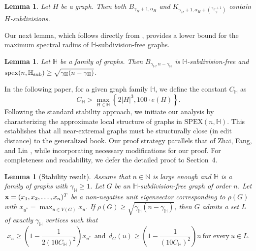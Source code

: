 \documentclass[11pt, a4paper]{article}
\newtheorem{lemma}[theorem]{Lemma}
\theoremstyle{definition}
\newcommand{\<}{\subseteq}
\newcommand{\red}[1]{\textcolor[rgb]{1.00,0.00,0.00}{#1}}
\begin{document}
\begin{lemma}\label{lem2.2}
    Let $H$ be a graph. Then both $B_{\gamma_H+1,\alpha_H}$ and $K_{\gamma_H+1,\alpha_H+\binom{\gamma_H+1}{2}}$ contain $H$-subdivisions.
\end{lemma}
Our next lemma, which follows directly from \cite[Lemma 2.6]{Zhai-minor}, provides a lower bound  for the maximum spectral radius of $\mathbb{H}$-subdivision-free graphs. 

\begin{lemma}\label{lem2.3}
Let $\mathbb{H}$ be a family of graphs. Then $B_{\gamma_\mathbb{H},n-\gamma_\mathbb{H}}$ is $\mathbb{H}$-subdivision-free and ${\rm spex}(n,\mathbb{H}_{\rm sub})\geq \sqrt{\gamma_\mathbb{H}(n-\gamma_\mathbb{H})}$.%
\end{lemma}

In the following paper, for a given graph family $\mathbb{H}$, we define the constant $C_\mathbb{H}$ as
$$
C_\mathbb{H}>\max_{H\in \mathbb{H}}\left\{2|H|^3,100\cdot e(H)\right\}.
$$
Following the standard stability approach, we initiate our analysis by characterizing the approximate local structure of graphs in $\mathrm{SPEX}(n,\mathbb{H})$. This establishes that all near-extremal graphs must be structurally close (in edit distance) to the generalized book.
Our proof strategy parallels that of Zhai, Fang, and Lin \cite{zhai}, while incorporating necessary modifications for our proof. For completeness and readability, we defer the detailed proof to Section~4.

\begin{lemma}[Stability result]\label{lem2.4}
    Assume that $n\in \mathbb{N}$ is large enough and $\mathbb{H}$ is a family of graphs with $\gamma_{\mathbb{H}}\geq 1$. 
    Let $G$ be an $\mathbb{H}$-subdivision-free graph of order $n$. Let ${\bf x}=(x_1,x_2,\ldots, x_n)^T$ be a non-negative unit eigenvector corresponding to $\rho(G)$ with $x_{u^{*}}=\max_{u \in V(G)}x_{u}$.
    If $\rho(G) \geq \sqrt{\gamma_\mathbb{H}(n-\gamma_\mathbb{H})}$, then $G$ admits a set $L$ of exactly $\gamma_\mathbb{H}$ vertices such that 
    $$
    x_{u} \geq \left(1-\frac{1}{2(10C_\mathbb{H})^{2}}\right)x_{u^{*}}\ \ \text{and}\ \ d_{G}(u) \geq \left(1-\frac{1}{(10C_\mathbb{H})^{2}}\right)n\ \text{for every}\ u \in L.
    $$ 
\end{lemma}
\end{document}

